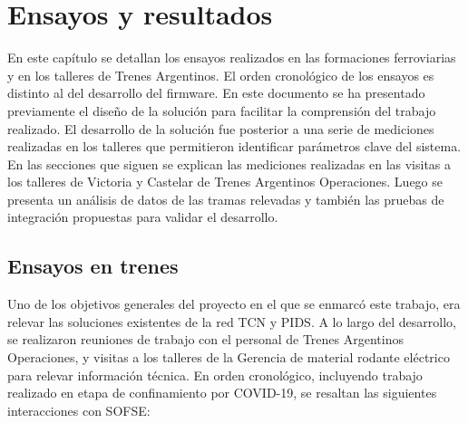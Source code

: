 
\chapter{Ensayos y resultados} %
En este capítulo se detallan los ensayos realizados en las formaciones ferroviarias y en los talleres de Trenes Argentinos. El orden cronológico de los ensayos es distinto al del desarrollo del firmware. En este documento se ha presentado previamente el diseño de la solución para facilitar la comprensión del trabajo realizado. El desarrollo de la solución fue posterior a una serie de mediciones realizadas en los talleres que permitieron identificar parámetros clave del sistema. \\

En las secciones que siguen se explican las mediciones realizadas en las visitas a los talleres de Victoria y Castelar de Trenes Argentinos Operaciones. Luego se presenta un análisis de datos de las tramas relevadas y también las pruebas de integración propuestas para validar el desarrollo. \\


\label{Chapter4} %

\section{Ensayos en trenes}

Uno de los objetivos generales del proyecto en el que se enmarcó este trabajo, era relevar las soluciones existentes de la red TCN y PIDS. A lo largo del desarrollo, se realizaron reuniones de trabajo con el personal de Trenes Argentinos Operaciones, y visitas a los talleres de la Gerencia de material rodante eléctrico para relevar información técnica. En orden cronológico, incluyendo trabajo realizado en etapa de confinamiento por COVID-19, se resaltan las siguientes interacciones con SOFSE:\\


